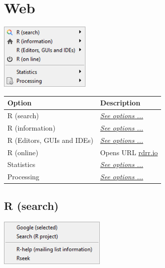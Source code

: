 
\hypertarget{menu_web}{}
\section{Web}

\includegraphics[scale=0.8]{./res/menu_web.png}\\

\begin{scriptsize}
  \begin{tabularx}{\textwidth}{>{\hsize=0.3\hsize}X>{\hsize=0.7\hsize}X}\\
    \hline
    \textbf{Option} & \textbf{Description} \\
    \hline
    R (search) & \textit{\href{\#menu\_web\_rsearch}{See options ...}} \\
    R (information) & \textit{\href{\#menu\_web\_rinformation}{See options ...}} \\
    R (Editors, GUIs and IDEs) & \textit{\href{\#menu\_web\_rguis}{See options ...}} \\
    R (online) & Opens URL \href{https://rdrr.io/snippets/}{rdrr.io} \\
    \hdashline[1pt/1pt]
    Statistics & \textit{\href{\#menu\_web\_statistics}{See options ...}} \\
    Processing & \textit{\href{\#menu\_web\_processing}{See options ...}} \\
    \hline
  \end{tabularx}
\end{scriptsize}


\hypertarget{menu_web_rsearch}{}
\subsection{R (search)}

\includegraphics[scale=0.8]{./res/menu_web_rsearch.png}\\

